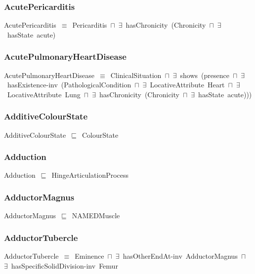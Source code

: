 \documentclass{article}
\begin{document}
\subsubsection*{AcutePericarditis}

AcutePericarditis~\ensuremath{\equiv}~Pericarditis~\ensuremath{\sqcap}~\ensuremath{\exists}~hasChronicity~(Chronicity~\ensuremath{\sqcap}~\ensuremath{\exists}~hasState~acute)

\subsubsection*{AcutePulmonaryHeartDisease}

AcutePulmonaryHeartDisease~\ensuremath{\equiv}~ClinicalSituation~\ensuremath{\sqcap}~\ensuremath{\exists}~shows~(presence~\ensuremath{\sqcap}~\ensuremath{\exists}~hasExistence-inv~(PathologicalCondition~\ensuremath{\sqcap}~\ensuremath{\exists}~LocativeAttribute~Heart~\ensuremath{\sqcap}~\ensuremath{\exists}~LocativeAttribute~Lung~\ensuremath{\sqcap}~\ensuremath{\exists}~hasChronicity~(Chronicity~\ensuremath{\sqcap}~\ensuremath{\exists}~hasState~acute)))

\subsubsection*{AdditiveColourState}

AdditiveColourState~\ensuremath{\sqsubseteq}~ColourState~

\subsubsection*{Adduction}

Adduction~\ensuremath{\sqsubseteq}~HingeArticulationProcess~

\subsubsection*{AdductorMagnus}

AdductorMagnus~\ensuremath{\sqsubseteq}~NAMEDMuscle~

\subsubsection*{AdductorTubercle}

AdductorTubercle~\ensuremath{\equiv}~Eminence~\ensuremath{\sqcap}~\ensuremath{\exists}~hasOtherEndAt-inv~AdductorMagnus~\ensuremath{\sqcap}~\ensuremath{\exists}~hasSpecificSolidDivision-inv~Femur
\end{document}
